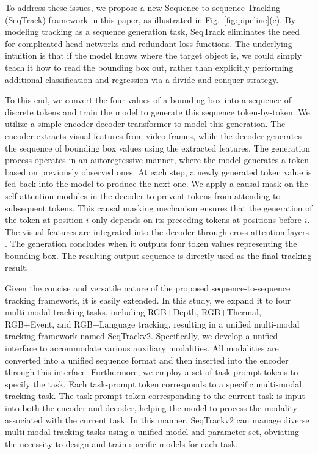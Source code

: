 To address these issues, we propose a new Sequence-to-sequence Tracking (SeqTrack) framework in this paper, as illustrated in Fig.~\ref{fig:pipeline}(c). By modeling tracking as a sequence generation task, SeqTrack eliminates the need for complicated head networks and redundant loss functions. The underlying intuition is that if the model knows where the target object is, we could simply teach it how to read the bounding box out, rather than explicitly performing additional classification and regression via a divide-and-conquer strategy. 

To this end, we convert the four values of a bounding box into a sequence of discrete tokens and train the model to generate this sequence token-by-token. We utilize a simple encoder-decoder transformer to model this generation. The encoder extracts visual features from video frames, while the decoder generates the sequence of bounding box values using the extracted features. The generation process operates in an autoregressive manner, where the model generates a token based on previously observed ones.
At each step, a newly generated token value is fed back into the model to produce the next one. We apply a causal mask on the self-attention modules in the decoder to prevent tokens from attending to subsequent tokens. This causal masking mechanism ensures that the generation of the token at position $i$ only depends on its preceding tokens at positions before $i$. The visual features are integrated into the decoder through cross-attention layers \cite{2017Attention}. The generation concludes when it outputs four token values representing the bounding box. The resulting output sequence is directly used as the final tracking result.

Given the concise and versatile nature of the proposed sequence-to-sequence tracking framework, it is easily extended. In this study, we expand it to four multi-modal tracking tasks, including RGB+Depth, RGB+Thermal, RGB+Event, and RGB+Language tracking, resulting in a unified multi-modal tracking framework named SeqTrackv2. Specifically, we develop a unified interface to accommodate various auxiliary modalities. All modalities are converted into a unified sequence format and then inserted into the encoder through this interface. Furthermore, we employ a set of task-prompt tokens to specify the task. Each task-prompt token corresponds to a specific multi-modal tracking task. The task-prompt token corresponding to the current task is input into both the encoder and decoder, helping the model to process the modality associated with the current task. In this manner, SeqTrackv2 can manage diverse multi-modal tracking tasks using a unified model and parameter set, obviating the necessity to design and train specific models for each task.

